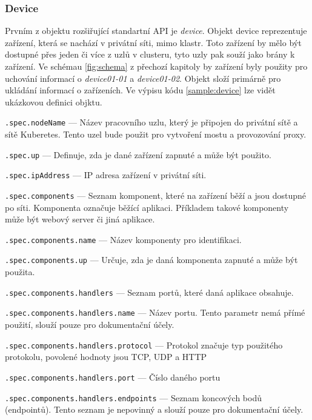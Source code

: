 \subsubsection*{Device}
Prvním z objektu rozšiřující standartní API je \textit{device}. Objekt device reprezentuje zařízení, která se nachází v privátní síti, mimo klastr. Toto zařízení by mělo být dostupné přes jeden či více z uzlů v clusteru, tyto uzly pak souží jako brány k zařízení. Ve schémau \ref{fig:schema} z přechozí kapitoly by zařízení byly použity pro uchování informací o \textit{device01-01} a \textit{device01-02}. Objekt složí primárně pro ukládání informací o zařízeních. Ve výpisu kódu \ref{sample:device} lze vidět ukázkovou definici objktu.

\begin{description}
    \item \verb|.spec.nodeName| --- Název pracovního uzlu, který je připojen do privátní sítě a sítě Kuberetes. Tento uzel bude použit pro vytvoření mostu a provozování proxy.
    \item \verb|.spec.up| --- Definuje, zda je dané zařízení zapnuté a může být použito.
    \item \verb|.spec.ipAddress| --- IP adresa zařízení v privátní síti.
    \item \verb|.spec.components| --- Seznam komponent, které na zařízení běží a jsou dostupné po síti. Komponenta označuje běžící aplikaci. Příkladem takové komponenty může být webový server či jiná aplikace.  
    \item \verb|.spec.components.name| --- Název komponenty pro identifikaci.
    \item \verb|.spec.components.up| --- Určuje, zda je daná komponenta zapnuté a může být použita.
    \item \verb|.spec.components.handlers| --- Seznam portů, které daná aplikace obsahuje.
    \item \verb|.spec.components.handlers.name| --- Název portu. Tento parametr nemá přímé použití, slouží pouze pro dokumentační účely. 
    \item \verb|.spec.components.handlers.protocol| --- Protokol značuje typ použitého protokolu, povolené hodnoty jsou TCP, UDP a HTTP
    \item \verb|.spec.components.handlers.port| --- Číslo daného portu
    \item \verb|.spec.components.handlers.endpoints| --- Seznam koncových bodů (endpointů). Tento seznam je nepovinný a slouží pouze pro dokumentační účely.
\end{description}

